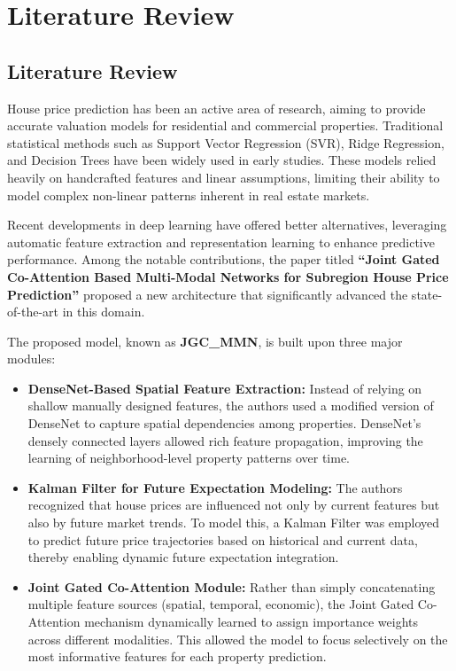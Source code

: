 \chapter{Literature Review}

\section{Literature Review}

House price prediction has been an active area of research, aiming to provide accurate valuation models for residential and commercial properties. Traditional statistical methods such as Support Vector Regression (SVR), Ridge Regression, and Decision Trees have been widely used in early studies. These models relied heavily on handcrafted features and linear assumptions, limiting their ability to model complex non-linear patterns inherent in real estate markets.

Recent developments in deep learning have offered better alternatives, leveraging automatic feature extraction and representation learning to enhance predictive performance. Among the notable contributions, the paper titled \textbf{``Joint Gated Co-Attention Based Multi-Modal Networks for Subregion House Price Prediction''} proposed a new architecture that significantly advanced the state-of-the-art in this domain.

The proposed model, known as \textbf{JGC\_MMN}, is built upon three major modules:

\begin{itemize}
    \item \textbf{DenseNet-Based Spatial Feature Extraction:} 
    Instead of relying on shallow manually designed features, the authors used a modified version of DenseNet to capture spatial dependencies among properties. DenseNet's densely connected layers allowed rich feature propagation, improving the learning of neighborhood-level property patterns over time.
    
    \item \textbf{Kalman Filter for Future Expectation Modeling:} 
    The authors recognized that house prices are influenced not only by current features but also by future market trends. To model this, a Kalman Filter was employed to predict future price trajectories based on historical and current data, thereby enabling dynamic future expectation integration.
    
    \item \textbf{Joint Gated Co-Attention Module:}
    Rather than simply concatenating multiple feature sources (spatial, temporal, economic), the Joint Gated Co-Attention mechanism dynamically learned to assign importance weights across different modalities. This allowed the model to focus selectively on the most informative features for each property prediction.
\end{itemize}

